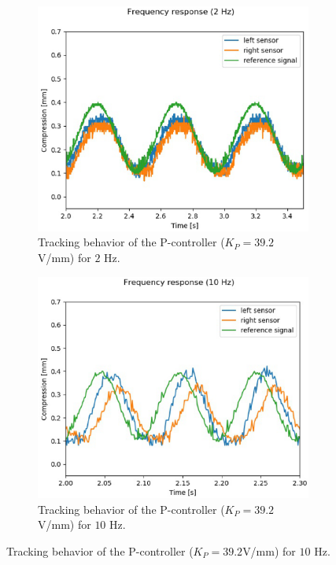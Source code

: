 \begin{figure}[h!]
    \centering
    \begin{minipage}{0.45\textwidth}
        \begin{figure}[H]
        	\centering
        	\includegraphics[width=1.0\linewidth]{Figs/2plot_zoom_P}
        	\caption{Tracking behavior of the P-controller ($K_P = 39.2$V/mm) for $2$ Hz.}
        	\label{fig:2plot_zoom_P}
        \end{figure}
    \end{minipage}
    \begin{minipage}{0.45\textwidth}
        \begin{figure}[H]
        	\centering
        	\includegraphics[width=1.0\linewidth]{Figs/10plot_zoom_P}
        	\caption{Tracking behavior of the P-controller ($K_P = 39.2$V/mm) for $10$ Hz.}
            \label{fig:10plot_zoom_P}
        \end{figure}
    \end{minipage}

\end{figure}


